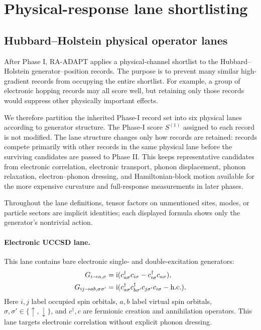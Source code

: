 \documentclass[
  reprint,
  amsmath,
  amssymb,
  aps,
  pra,
  nofootinbib,
  superscriptaddress,
  floatfix
]{revtex4-2}
\newcommand{\ii}{\mathrm{i}}
\begin{document}
\section{Physical-response lane shortlisting}
\label{app:lane_shortlisting}

\subsection{Hubbard--Holstein physical operator lanes}
\label{subsec:hh_physical_operator_lanes}
%
\noindent
After Phase I, \textsc{RA-ADAPT} applies a physical-channel shortlist to the Hubbard--Holstein generator--position records. The purpose is to prevent many similar high-gradient records from occupying the entire shortlist. For example, a group of electronic hopping records may all score well, but retaining only those records would suppress other physically important effects.

We therefore partition the inherited Phase-I record set into six physical lanes according to generator structure. The Phase-I score \(S^{(1)}\) assigned to each record is not modified. The lane structure changes only how records are retained: records compete primarily with other records in the same physical lane before the surviving candidates are passed to Phase II. This keeps representative candidates from electronic correlation, electronic transport, phonon displacement, phonon relaxation, electron--phonon dressing, and Hamiltonian-block motion available for the more expensive curvature and full-response measurements in later phases.

Throughout the lane definitions, tensor factors on unmentioned sites, modes,
or particle sectors are implicit identities; each displayed formula shows only
the generator's nontrivial action.

\paragraph*{Electronic UCCSD lane.}
This lane contains bare electronic single- and double-excitation generators:
\begin{align*}
G_{i\to a,\sigma}
&=
\ii(c_{a\sigma}^{\dagger}c_{i\sigma}
-c_{i\sigma}^{\dagger}c_{a\sigma}),\\
G_{ij\to ab,\sigma\sigma'}
&=
\ii(c_{a\sigma}^{\dagger}c_{b\sigma'}^{\dagger}
c_{j\sigma'}c_{i\sigma}
-{\rm h.c.}) .
\end{align*}
Here \(i,j\) label occupied spin orbitals, \(a,b\) label virtual spin orbitals,
\(\sigma,\sigma'\in\{\uparrow,\downarrow\}\), and \(c^\dagger,c\) are
fermionic creation and annihilation operators. This lane targets electronic
correlation without explicit phonon dressing.
\end{document}
